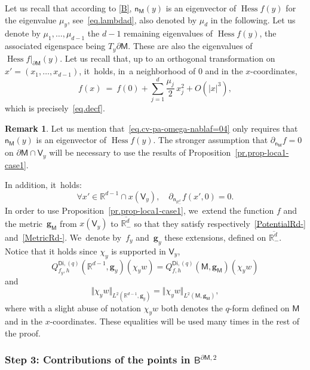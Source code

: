 \documentclass[10pt]{amsart}
\newcommand{\mbf}[1]{\mathbf{#1}}
\let\pa\partial
\DeclareMathOperator{\hess}{Hess}\let\Hess\hess
\theoremstyle{plain}
\theoremstyle{definition}
\newtheorem{remark}[proposition]{Remark}
\begin{document}
Let us recall that according to \ref{B}, $\mathsf n_{\mathsf M}(y)$ is an eigenvector of $\Hess f(y)$ for the eigenvalue $\mu_y$, see~\eqref{eq.lambdad}, also denoted by $\mu_{d}$ in the following.
Let us denote by $\mu_1,\dots,\mu_{d-1}$ the $d-1$ remaining eigenvalues of
$\Hess f(y)$, the associated eigenspace being $T_y\partial \mathsf M$.
These are also the eigenvalues of $\hess f|_{\partial \mathsf M}(y)$.
Let us recall that, up to an orthogonal transformation on
$x'=(x_{1},\dots,x_{d-1})$, it~holds, in~a neighborhood of $0$ and in the $x$-coordinates,
\begin{equation}\label{eq.cv-pa-omega-nablaf=04}
f(x)\ =\ f(0)+ \sum_{j=1}^d \frac{\mu_j}{2} \, x_j^2+ O(\vert x\vert^3),
\end{equation}
which is precisely~\eqref{eq.decf}.
\begin{remark}
Let us mention that~\eqref{eq.cv-pa-omega-nablaf=04} only requires that $\mathsf n_{\mathsf M}(y)$ is an eigenvector of $\Hess f(y)$. The stronger assumption that $\partial_{\mathsf n_{\mathsf M}}f=0$ on $\pa \mathsf M\cap \mathsf V_y$ will be necessary to use the results of Proposition~\ref{pr.prop-loca1-case1}.
\end{remark}

In addition, it~holds:
\begin{equation}\label{eq.stable2}
\forall x'\in \mathbb R^{d-1} \cap x(\mathsf V_y), \quad \partial_{\mathsf n_{\mathbb R^d_-}}f(x',0)=0.
\end{equation}
In order to use Proposition~\ref{pr.prop-loca1-case1}, we~extend the function $f$ and the metric~$\mbf g_{\mathsf M}$ from $x(\mathsf V_y)$ to $\overline{\mathbb R^{d}_-}$ so that they satisfy respectively~\ref{PotentialRd-} and~\ref{MetricRd-}. We~denote by~$f_y$ and~$\mbf g_y$ these extensions, defined on $\overline{\mathbb R^d_-}$.
Notice that it holds since $\chi_y$ is supported in $\mathsf V_y$,
\[
Q_{f_y,h}^{\mathsf{Di},(q)}(\mathbb R^{d-1},\mbf g_y)(\chi_y
w)=Q_{f,h}^{\mathsf{Di},(q)}(\mathsf M,\mbf g_{\mathsf M})(\chi_y
w)
\]
and
\[
\Vert \chi_y w \Vert_{L^2(\mathbb R^{d-1},\mbf
g_y)}= \Vert \chi_y w \Vert_{L^2(\mathsf M,\mbf g_{\mathsf M})},
\]
where with a slight abuse of notation $\chi_y w$ both denotes the $q$-form defined on $\mathsf M$ and in the $x$-coordinates. These equalities will be used many times in the rest of the proof.

\subsubsection*{Step 3: Contributions of the points in $ \mathsf B^{\pa \mathsf M,2}$}
\end{document}
